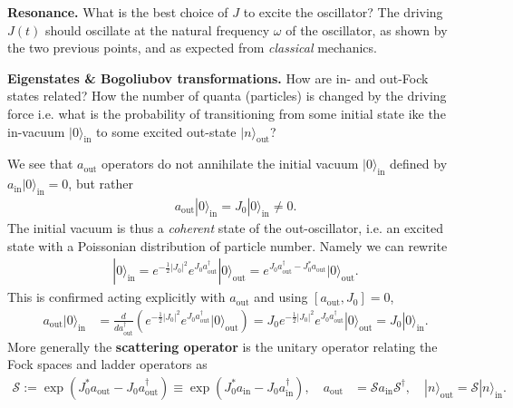 \documentclass[../QFT_main.tex]{subfiles}
\begin{document}
\begin{mytheorem}
\noindent
\textbf{Resonance.} What is the best choice of $J$ to excite the oscillator? The driving $J(t)$ should oscillate at the natural frequency $\omega$ of the oscillator, as shown by the two previous points, and as expected from \emph{classical} mechanics.
\smallskip

\noindent
\textbf{Eigenstates \& Bogoliubov transformations.}
How are in- and out-Fock states related? How the number of quanta (particles) is changed by the driving force i.e. what is the probability of transitioning from some initial state ike the in-vacuum $|0\rangle_{\mathrm{in}}$ to some excited out-state $|n\rangle_{\mathrm{out}}$?

We see that $a_{\mathrm{out}}$ operators do not annihilate the initial vacuum $|0\rangle_{\mathrm{in}}$ defined by $a_{\mathrm{in}} |0\rangle_{\mathrm{in}} = 0$, but rather 
\begin{align}
    a_{\mathrm{out}} |0\rangle_{\mathrm{in}} = J_0 |0\rangle_{\mathrm{in}} \neq 0.
\end{align}
The initial vacuum is thus a \emph{coherent} state of the out-oscillator, i.e. an excited state with a Poissonian distribution of particle number.
Namely we can rewrite
\begin{align}\label{eq:disentangle_scattering_operator_driven_harmonic_oscillator_1d}
    |0\rangle_{\mathrm{in}} = e^{-\frac{1}{2} |J_0|^2} e^{J_0 a_{\mathrm{out}}^\dagger} |0\rangle_{\mathrm{out}} = e^{J_0 a_{\mathrm{out}}^\dagger - J_0^* a_{\mathrm{out}}} |0\rangle_{\mathrm{out}}.
\end{align}
This is confirmed acting explicitly with $a_{\mathrm{out}}$ and using $[a_{\mathrm{out}},J_0]=0$,
\begin{align}
    a_{\mathrm{out}} |0\rangle_{\mathrm{in}} &= \frac{d}{d a_{\mathrm{out}}^\dagger} \left(e^{-\frac{1}{2} |J_0|^2} e^{J_0 a_{\mathrm{out}}^\dagger} |0\rangle_{\mathrm{out}}\right)
    = J_0 e^{-\frac{1}{2} |J_0|^2} e^{J_0 a_{\mathrm{out}}^\dagger} |0\rangle_{\mathrm{out}} = J_0 |0\rangle_{\mathrm{in}}.
\end{align}
More generally the \textbf{scattering operator} is the unitary operator relating the Fock spaces and ladder operators as
\begin{align}\label{eq:scattering_operator_harmonic_oscillator_1d}
    \mathcal{S}:=\exp\left(J_0^* a_{\mathrm{out}}-J_0 a_{\mathrm{out}}^\dagger \right)\equiv \exp\left(J_0^* a_{\mathrm{in}}-J_0 a_{\mathrm{in}}^\dagger \right),\quad
    a_{\mathrm{out}} &= \mathcal{S} a_{\mathrm{in}} \mathcal{S}^\dagger, \quad |n\rangle_{\mathrm{out}} = \mathcal{S} |n\rangle_{\mathrm{in}}.

\end{align}
\end{mytheorem}
\end{document}
